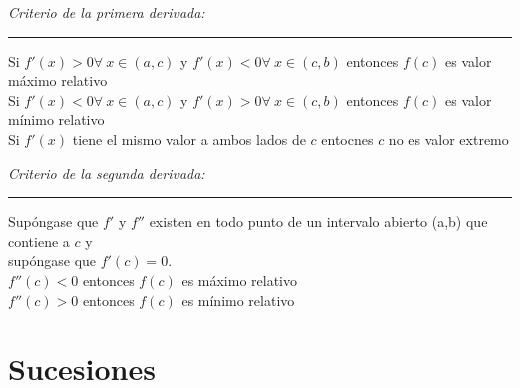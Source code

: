 \documentclass[12pt,a4paper]{extarticle}
\begin{document}
\begin{minipage}{16cm}
\begin{center}
\emph{Criterio de la primera derivada:}
\end{center}
\hrule
\vspace{1em}
Si \(f'(x)>0 \forall \ x \in (a,c)\) y \(f'(x)<0 \forall \ x \in
(c,b)\) entonces \(f(c)\) es valor m\'aximo relativo \\[1em]
Si \(f'(x)<0 \forall \ x \in (a,c)\) y \(f'(x)>0 \forall \ x \in
(c,b)\) entonces \(f(c)\) es valor m\'inimo relativo \\[1em]
Si \(f'(x)\) tiene el mismo valor a ambos lados de \(c\) entocnes \(c\) no es
valor extremo\\
\vspace{0.5em}
\end{minipage}

\begin{minipage}{16cm}
\begin{center}
\emph{Criterio de la segunda derivada:}
\end{center}
\hrule
\vspace{1em}
Sup\'ongase que \(f'\) y \(f''\) existen en todo punto de un intervalo
abierto (a,b) que contiene a \(c\) y\\
 sup\'ongase que \(f'(c)=0\).\\[1em]
\(f''(c) < 0\) entonces \(f(c)\) es m\'aximo relativo \\[1em]
\(f''(c) > 0\) entonces \(f(c)\) es m\'inimo relativo \\[1em]
\end{minipage}
\section{Sucesiones}
\end{document}
